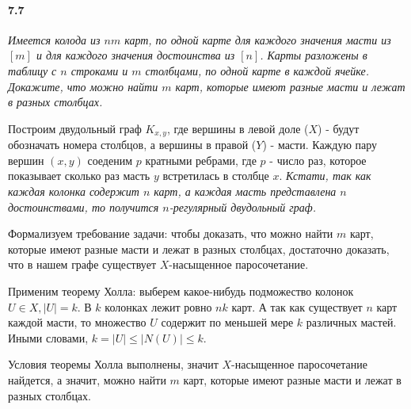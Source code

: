 \documentclass[russian]{article}
\begin{document}
\paragraph{7.7} \textit{Имеется колода из $nm$ карт, по одной карте для каждого значения масти из $[m]$ и для каждого значения достоинства из $[n]$. Карты разложены в таблицу с $n$ строками и $m$ столбцами, по одной карте в каждой ячейке. Докажите, что можно найти $m$ карт, которые имеют разные масти и лежат в разных столбцах.}

Построим двудольный граф $K_{x,y}$, где вершины в левой доле ($X$) - будут обозначать номера столбцов, а вершины в правой ($Y$) - масти. Каждую пару вершин $(x, y)$ соеденим $p$ кратными ребрами, где $p$ - число раз, которое показывает сколько раз масть $y$ встретилась в столбце $x$. \textit{Кстати, так как каждая колонка содержит $n$ карт, а каждая масть представлена $n$ достоинствами, то получится $n$-регулярный двудольный граф.}

Формализуем требование задачи: чтобы доказать, что можно найти $m$ карт, которые имеют разные масти и лежат в разных столбцах, достаточно доказать, что в нашем графе существует $X$-насыщенное паросочетание.

Применим теорему Холла: выберем какое-нибудь подможество колонок $U \in X, |U|=k$. В $k$ колонках лежит ровно $nk$ карт. А так как существует $n$ карт каждой масти, то множество $U$ содержит по меньшей мере $k$ различных мастей. Иными словами, $k = |U| \leqslant |N(U)| \leqslant k$.

Условия теоремы Холла выполнены, значит $X$-насыщенное паросочетание найдется, а значит, можно найти $m$ карт, которые имеют разные масти и лежат в разных столбцах.
\end{document}
